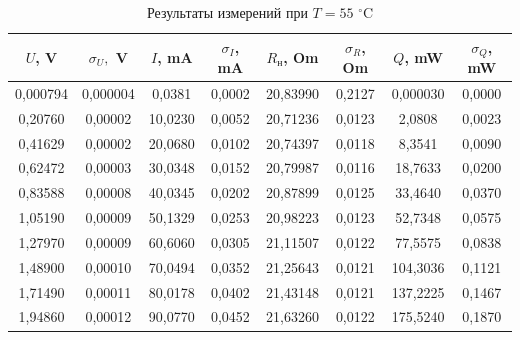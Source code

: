 \documentclass[a4paper,12pt]{article}
\begin{document}
\begin{table}[H]
    \centering
    \begin{tabular}{|c|c|c|c|c|c|c|c|}
    \hline
        $U$, V & $\sigma_U,$ V & $I$, mA & $\sigma_I$, mA & $R_н$, Om & $\sigma_R$, Om & $Q$, mW & $\sigma_Q$, mW \\ \hline
        0,000794 & 0,000004 & 0,0381 & 0,0002 & 20,83990 & 0,2127 & 0,000030 & 0,0000 \\ \hline
        0,20760 & 0,00002 & 10,0230 & 0,0052 & 20,71236 & 0,0123 & 2,0808 & 0,0023 \\ \hline
        0,41629 & 0,00002 & 20,0680 & 0,0102 & 20,74397 & 0,0118 & 8,3541 & 0,0090 \\ \hline
        0,62472 & 0,00003 & 30,0348 & 0,0152 & 20,79987 & 0,0116 & 18,7633 & 0,0200 \\ \hline
        0,83588 & 0,00008 & 40,0345 & 0,0202 & 20,87899 & 0,0125 & 33,4640 & 0,0370 \\ \hline
        1,05190 & 0,00009 & 50,1329 & 0,0253 & 20,98223 & 0,0123 & 52,7348 & 0,0575 \\ \hline
        1,27970 & 0,00009 & 60,6060 & 0,0305 & 21,11507 & 0,0122 & 77,5575 & 0,0838 \\ \hline
        1,48900 & 0,00010 & 70,0494 & 0,0352 & 21,25643 & 0,0121 & 104,3036 & 0,1121 \\ \hline
        1,71490 & 0,00011 & 80,0178 & 0,0402 & 21,43148 & 0,0121 & 137,2225 & 0,1467 \\ \hline
        1,94860 & 0,00012 & 90,0770 & 0,0452 & 21,63260 & 0,0122 & 175,5240 & 0,1870 \\ \hline
    \end{tabular}
    \caption{Результаты измерений при $T = 55$ $^\circ$C}
\end{table}
\end{document}
